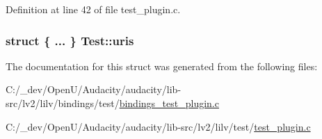 Definition at line 42 of file test\+\_\+plugin.\+c.

\subsubsection[{\texorpdfstring{uris}{uris}}]{\setlength{\rightskip}{0pt plus 5cm}struct \{ ... \}   Test\+::uris}\hypertarget{struct_test_af9349b24b598191afc7ebe18298f6a90}{}\label{struct_test_af9349b24b598191afc7ebe18298f6a90}


The documentation for this struct was generated from the following files\+:\begin{DoxyCompactItemize}
\item 
C\+:/\+\_\+dev/\+Open\+U/\+Audacity/audacity/lib-\/src/lv2/lilv/bindings/test/\hyperlink{bindings__test__plugin_8c}{bindings\+\_\+test\+\_\+plugin.\+c}\item 
C\+:/\+\_\+dev/\+Open\+U/\+Audacity/audacity/lib-\/src/lv2/lilv/test/\hyperlink{test__plugin_8c}{test\+\_\+plugin.\+c}\end{DoxyCompactItemize}
